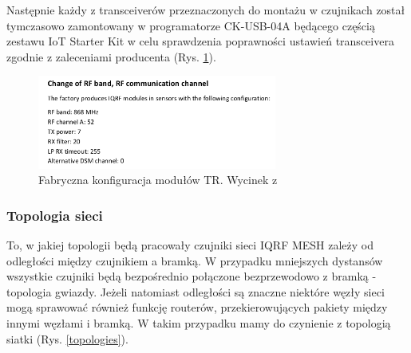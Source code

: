 Następnie każdy z transceiverów przeznaczonych do montażu w czujnikach został tymczasowo zamontowany w programatorze CK-USB-04A będącego częścią
zestawu IoT Starter Kit w celu sprawdzenia poprawności ustawień transceivera zgodnie z zaleceniami producenta (Rys. \ref{fab-conf}).

\begin{figure}[H]
    \centering
    \includegraphics[width=0.7\textwidth]{zdj/protronix-settings.png}
    \caption{Fabryczna konfiguracja modułów TR. Wycinek z \cite{protronix-comms}}
    \label{fab-conf}
\end{figure}

\subsubsection{Topologia sieci}

To, w jakiej topologii będą pracowały czujniki sieci IQRF MESH zależy od odległości między czujnikiem a bramką. W przypadku 
mniejszych dystansów wszystkie czujniki będą bezpośrednio połączone bezprzewodowo z bramką - topologia gwiazdy. Jeżeli natomiast
odległości są znaczne niektóre węzły sieci mogą sprawować również funkcję routerów, przekierowujących pakiety między innymi 
węzłami i bramką. W takim przypadku mamy do czynienie z topologią siatki (Rys. \ref{topologies}).


